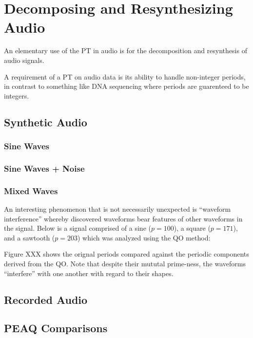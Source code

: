 \chapter{Decomposing and Resynthesizing Audio}
An elementary use of the PT in audio is for the decomposition and resynthesis of audio signals.

A requirement of a PT on audio data is its ability to handle non-integer periods, in contrast to something like DNA sequencing where periods are guarenteed to be integers.

\section{Synthetic Audio}

    \subsection{Sine Waves}

    \subsection{Sine Waves + Noise}

    \subsection{Mixed Waves}
    An interesting phenomenon that is not necessarily unexpected is ``waveform interference'' whereby discovered waveforms bear features of other waveforms in the signal. Below is a signal comprised of a sine ($p = 100$), a square ($p = 171$), and a sawtooth ($p = 203$) which was analyzed using the QO method:

    Figure XXX shows the orignal periods compared against the periodic components derived from the QO. Note that despite their mututal prime-ness, the waveforms ``interfere'' with one another with regard to their shapes.




\section{Recorded Audio}


\section{PEAQ Comparisons}
